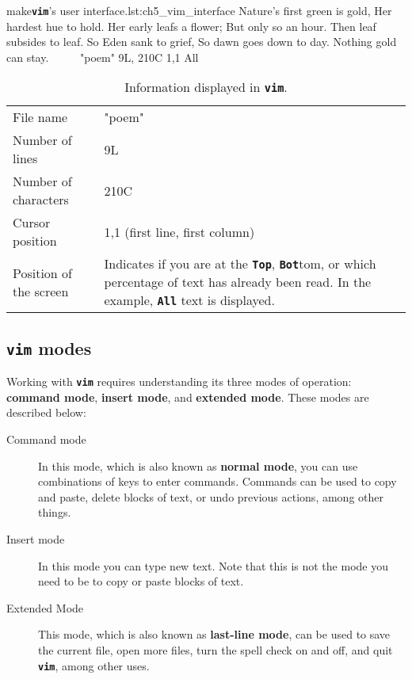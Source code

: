 \begin{source_code_float}{make}{\textbf{\texttt{vim}}'s user interface.}{lst:ch5_vim_interface}
Nature's first green is gold,
Her hardest hue to hold.
Her early leafs a flower;
But only so an hour.
Then leaf subsides to leaf.
So Eden sank to grief,
So dawn goes down to day.
Nothing gold can stay.
~
~
~
"poem" 9L, 210C                        1,1           All
\end{source_code_float}

\begin{table}[!htbp]
   \myfloatalign
   \begin{tabularx}{\textwidth}{Xp{70mm}} \toprule
     File name & "poem" \\
     Number of lines & 9L \\
     Number of characters & 210C \\
     Cursor position & 1,1 (first line, first column) \\
     Position of the screen & Indicates if you are at the \textbf{\texttt{Top}}, \textbf{\texttt{Bot}}tom, or which percentage of text has already been read. In the example, \textbf{\texttt{All}} text is displayed. \\
   \bottomrule
   \end{tabularx}
\caption{Information displayed in \textbf{\texttt{vim}}.}
\label{tab:ch5_info_vim}
\end{table}

\subsection*{\textbf{\texttt{vim}} modes}

Working with \textbf{\texttt{vim}} requires understanding its three modes of operation: \textbf{command mode}, \textbf{insert mode}, and \textbf{extended mode}. These modes are described below:

\begin{description}
\item[Command mode] In this mode, which is also known as \textbf{normal mode}, you can use combinations of keys to enter commands. Commands can be used to copy and paste, delete blocks of text, or undo previous actions, among other things.
\item[Insert mode] In this mode you can type new text. Note that this is not the mode you need to be to copy or paste blocks of text.
\item[Extended Mode] This mode, which is also known as \textbf{last-line mode}, can be used to save the current file, open more files, turn the spell check on and off, and quit \textbf{\texttt{vim}}, among other uses.
\end{description}

